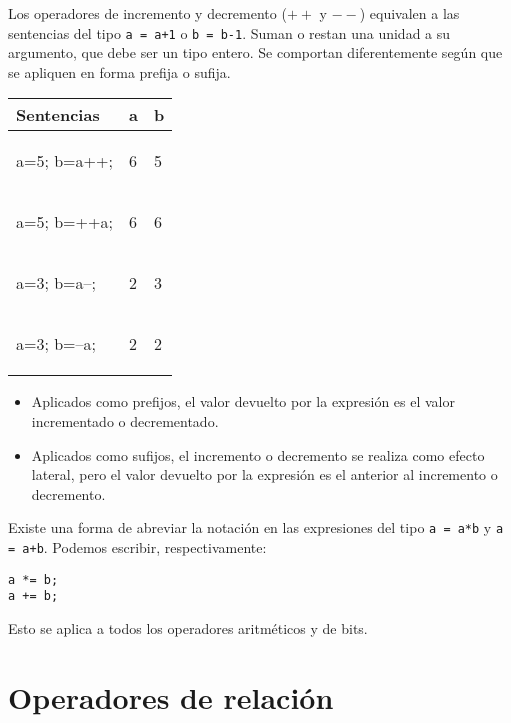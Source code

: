 \begin{ejemplo}
Los operadores de incremento y decremento ($++$ y $--$) equivalen a las sentencias del tipo \lstinline{a = a+1} o \lstinline{b = b-1}. Suman o restan una unidad a su argumento, que debe ser un tipo entero. Se comportan diferentemente según que se apliquen en forma prefija o sufija.


\centering
\begin{tabular}{l|l|l}
Sentencias & a & b \\
\hline
\begin{codecell}
a=5; 
b=a++;
\end{codecell}
&
6
&
5\\
\hline
\begin{codecell}
a=5; 
b=++a;
\end{codecell}
&
6
&
6\\
\hline
\begin{codecell}
a=3; 
b=a--;
\end{codecell}
&
2
&
3\\	
\hline
\begin{codecell}
a=3; 
b=--a;
\end{codecell}
&
2
&
2\\
\end{tabular}

\begin{itemize}
	\item Aplicados como prefijos, el valor devuelto por la expresión es el valor incrementado o decrementado.
	\item Aplicados como sufijos, el incremento o decremento se realiza como efecto lateral, pero el valor devuelto por la expresión es el anterior al incremento o decremento.
\end{itemize}
\end{ejemplo}


Existe una forma de abreviar la notación en las expresiones del tipo \lstinline{a = a*b} y \lstinline{a = a+b}. Podemos escribir, respectivamente:
\begin{lstlisting}
a *= b;
a += b; 
\end{lstlisting}

Esto se aplica a todos los operadores aritméticos y de bits.

\section{Operadores de relación}

